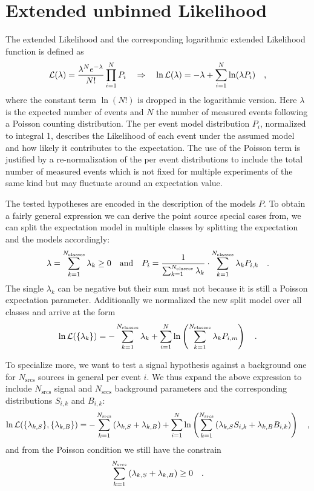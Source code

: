 \section{Extended unbinned Likelihood}
The extended Likelihood  and the corresponding logarithmic extended Likelihood function is defined as
\begin{equation}
  \mathcal{L}(\lambda) = \frac{\lambda^N e^{-\lambda}}{N!}\prod_{i=1}^N P_i
  \quad\Rightarrow\quad
    \ln\mathcal{L}(\lambda) = -\lambda+\sum_{i=1}^N \ln(\lambda P_i)
  \quad\text{,}
\end{equation}
where the constant term $\ln(N!)$ is dropped in the logarithmic version.
Here $\lambda$ is the expected number of events and $N$ the number of measured events following a Poisson counting distribution.
The per event model distribution $P_i$, normalized to integral 1, describes the Likelihood of each event under the assumed model and how likely it contributes to the expectation.
The use of the Poisson term is justified by a re-normalization of the per event distributions to include the total number of measured events which is not fixed for multiple experiments of the same kind but may fluctuate around an expectation value.

The tested hypotheses are encoded in the description of the models $P$.
To obtain a fairly general expression we can derive the point source special cases from, we can split the expectation model in multiple classes by splitting the expectation and the models accordingly:
\begin{equation}
  \lambda = \sum_{k=1}^{N_\text{classes}} \lambda_k \geq 0
  \quad\text{and}\quad
  P_i = \frac{1}{\sum_{k=1}^{N_\text{classes}} \lambda_k}\cdot
         \sum_{k=1}^{N_\text{classes}} \lambda_k P_{i,k}
  \quad\text{.}
\end{equation}
The single $\lambda_k$ can be negative but their sum must not because it is still a Poisson expectation parameter.
Additionally we normalized the new split model over all classes and arrive at the form
\begin{equation}
  \ln\mathcal{L}(\{\lambda_k\})
  = -\sum_{k=1}^{N_\text{classes}} \lambda_k +
    \sum_{i=1}^N \ln\left(\sum_{k=1}^{N_\text{classes}}
      \lambda_k P_{i,m} \right)
  \quad\text{.}
\end{equation}

To specialize more, we want to test a signal hypothesis against a background one for $N_\text{srcs}$ sources in general per event $i$.
We thus expand the above expression to include $N_\text{srcs}$ signal and $N_\text{srcs}$ background parameters and the corresponding distributions $S_{i,k}$ and $B_{i,k}$:
\begin{equation}
  \ln\mathcal{L}(\{\lambda_{k,S}\}, \{\lambda_{k,B}\})
  = -\sum_{k=1}^{N_\text{srcs}}\left(\lambda_{k,S}+\lambda_{k,B}\right) +
    \sum_{i=1}^N \ln\left(\sum_{k=1}^{N_\text{srcs}}\left(
      \lambda_{k,S} S_{i,k}+\lambda_{k,B} B_{i,k}\right)\right)
  \quad\text{,}
\end{equation}
and from the Poisson condition we still have the constrain
\begin{equation}
  \sum_{k=1}^{N_\text{srcs}}\left(\lambda_{k,S}+\lambda_{k,B}\right) \geq 0
  \quad\text{.}
\end{equation}

